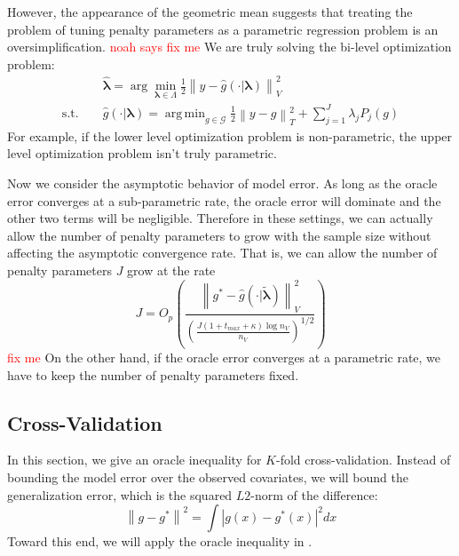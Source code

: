 \documentclass[12pt]{article}
\DeclareMathOperator*{\argmin}{arg\,min}
\begin{document}
However, the appearance of the geometric mean suggests that treating the problem of tuning penalty parameters as a parametric regression problem is an oversimplification. \textcolor{red}{noah says fix me} We are truly solving the bi-level optimization problem:
\begin{eqnarray}
\label{eq:bilevel}
&& \hat{\boldsymbol \lambda} = \arg\min_{\boldsymbol{\lambda} \in\Lambda} \frac{1}{2} \left \| y-\hat{g}(\cdot | \boldsymbol \lambda) \right \|_{V}^{2}\\
\text{s.t. } && \hat{g}(\cdot | \boldsymbol \lambda) = \argmin_{g\in \mathcal{G}} \frac{1}{2} \left \|y -  g \right \|_T^2 + \sum_{j=1}^J \lambda_j P_j(g)
\end{eqnarray}
For example, if the lower level optimization problem is non-parametric, the upper level optimization problem isn't truly parametric.

Now we consider the asymptotic behavior of model error. As long as the oracle error converges at a sub-parametric rate, the oracle error will dominate and the other two terms will be negligible. Therefore in these settings, we can actually allow the number of penalty parameters to grow with the sample size without affecting the asymptotic convergence rate. That is, we can allow the number of penalty parameters $J$ grow at the rate
\begin{equation}
J = O_p\left (
\frac{\left \| g^*-\hat{g}(\cdot | \tilde{\boldsymbol {\lambda}}) \right \|_{V}^{2}}
{\left(\frac{J\left(1+t_{max}+\kappa\right)\log n_{V}}{n_{V}}\right)^{1/2}}
\right)
\end{equation}
\textcolor{red}{fix me}
On the other hand, if the oracle error converges at a parametric rate, we have to keep the number of penalty parameters fixed.

\subsection{Cross-Validation}

In this section, we give an oracle inequality for $K$-fold cross-validation. Instead of bounding the model error over the observed covariates, we will bound the generalization error, which is the squared $L2$-norm of the difference:
\begin{equation}
\left \| g - g^* \right \|^2 = \int \left |g(x) - g^*(x) \right |^2 dx
\end{equation}
Toward this end, we will apply the oracle inequality in \citet{lecue2012oracle}.
\end{document}
